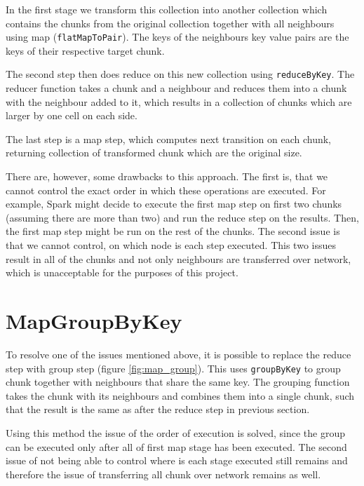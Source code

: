 \documentclass{l4proj}
\begin{document}
In the first stage we transform this collection into another collection which contains
the chunks from the original collection together with all neighbours using map
(\texttt{flatMapToPair}). The keys of the neighbours key value pairs are the keys of their respective
target chunk.

The second step then does reduce on this new collection using \texttt{reduceByKey}. 
The reducer function takes a chunk and a neighbour and reduces them into a chunk
with the neighbour added to it, which results in a collection of chunks which are
larger by one cell on each side.

The last step is a map step, which computes next transition on each chunk, returning
collection of transformed chunk which are the original size.

There are, however, some drawbacks to this approach. The first is, that we cannot
control the exact order in which these operations are executed. For example, Spark
might decide to execute the first map step on first two chunks (assuming there are more than two)
and run the reduce step on the results. Then, the first map step might be run on the rest
of the chunks. The second issue is that we cannot control, on which node is each step 
executed. This two issues result in all of the chunks and not only neighbours are
transferred over network, which is unacceptable for the purposes of this project.

\section{MapGroupByKey}

To resolve one of the issues mentioned above, it is possible to replace the reduce
step with group step (figure \ref{fig:map_group}). This uses \texttt{groupByKey} to group chunk together with
neighbours that share the same key. The grouping function takes the chunk with
its neighbours and combines them into a single chunk, such that the result is the
same as after the reduce step in previous section.

Using this method the issue of the order of execution is solved, since the group
can be executed only after all of first map stage has been executed. The second issue
of not being able to control where is each stage executed still remains and therefore
the issue of transferring all chunk over network remains as well.
\end{document}

